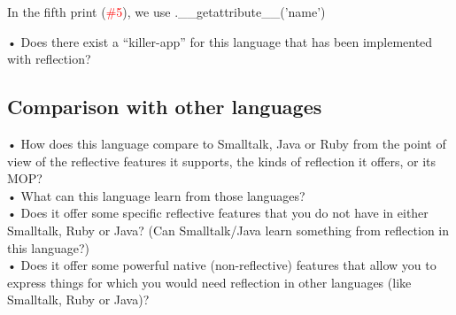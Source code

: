 In the fifth print (\textcolor{red}{\#5}), we use .\_\_getattribute\_\_('name') 



•	Does there exist a “killer-app” for this language that has been implemented with reflection?\\

\subsection{Comparison with other languages}
•	How does this language compare to Smalltalk, Java or Ruby from the point of view of the reflective features it supports, the kinds of reflection it offers, or its MOP?\\
•	What can this language learn from those languages?\\
•	Does it offer some specific reflective features that you do not have in either Smalltalk, Ruby or Java? (Can Smalltalk/Java learn something from reflection in this language?)\\
•	Does it offer some powerful native (non-reflective) features that allow you to express things for which you would need reflection in other languages (like Smalltalk, Ruby or Java)?\\
